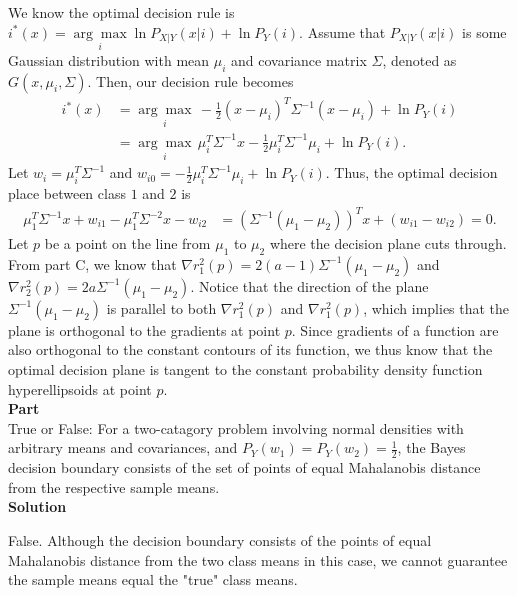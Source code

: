 \documentclass{article}
\newcounter{partCounter}
\renewcommand{\part}[1]{\textbf{\large Part \Alph{partCounter}}\stepcounter{partCounter}\\}
\begin{document}
We know the optimal decision rule is $i^*(x) = \underset{i}{\arg \max} \ln P_{X|Y}(x|i) + \ln P_Y(i)$. Assume that $P_{X|Y}(x|i)$ is some Gaussian distribution with mean $\mu_i$ and covariance matrix $\Sigma$, denoted as $G(x, \mu_i, \Sigma)$. Then, our decision rule becomes 
\begin{align*}
  i^*(x) 
  &= \underset{i}{\arg \max} \, -\frac{1}{2}(x - \mu_i)^T\Sigma^{-1}(x - \mu_i) + \ln P_Y(i) \\
  &= \underset{i}{\arg \max} \, \mu_i^T\Sigma^{-1} x - \frac{1}{2}\mu_i^T\Sigma^{-1}\mu_i + \ln P_Y(i).
\end{align*}
Let $w_i = \mu_i^T\Sigma^{-1}$ and $w_{i0} = -\frac{1}{2}\mu_i^T\Sigma^{-1}\mu_i + \ln P_Y(i)$. Thus, the optimal decision place between class $1$ and $2$ is
\begin{align*}
  \mu_1^T\Sigma^{-1} x + w_{i1} - \mu_1^T\Sigma^{-2} x - w_{i2}
  &= (\Sigma^{-1}(\mu_1 - \mu_2))^T x + (w_{i1} - w_{i2}) = 0.
\end{align*}
Let $p$ be a point on the line from $\mu_1$ to $\mu_2$ where the decision plane cuts through. From part C, we know that $\nabla r^2_1(p) = 2(a - 1)\Sigma^{-1}(\mu_1 - \mu_2)$ and $\nabla r^2_2(p) = 2a\Sigma^{-1}(\mu_1 - \mu_2)$. Notice that the direction of the plane $\Sigma^{-1}(\mu_1 - \mu_2)$ is parallel to both $\nabla r^2_1(p)$ and $\nabla r^2_1(p)$, which implies that the plane is orthogonal to the gradients at point $p$. Since gradients of a function are also orthogonal to the constant contours of its function, we thus know that the optimal decision plane is tangent to the constant probability density function hyperellipsoids at point $p$. \\

\part{E}

True or False: For a two-catagory problem involving normal densities with arbitrary means and covariances, and $P_Y(w_1) = P_Y(w_2) = \frac{1}{2}$, the Bayes decision boundary consists of the set of points of equal Mahalanobis distance from the respective sample means. \\

\textbf{Solution}

False. Although the decision boundary consists of the points of equal Mahalanobis distance from the two class means in this case, we cannot guarantee the sample means equal the "true" class means.
\end{document}
